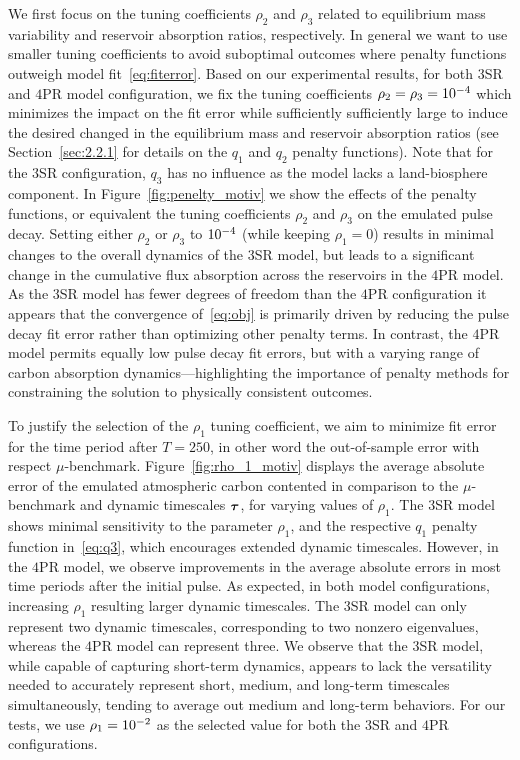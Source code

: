 \documentclass[11pt, a4paper, pdftex, twoside, dvipsnames]{article}
\renewcommand{\ref}{\cref}
\newcommand{\bb}[1]{\boldsymbol{\bold{#1}}}
\newcommand{\expnum}[2]{
\ifnum#1=1 
  10^{#2} 
\else 
  #1 \! \cdot \! 10^{#2}
\fi
}
\begin{document}
We first focus on the tuning coefficients $\rho_2$ and $\rho_3$ related to equilibrium mass variability and reservoir absorption ratios, respectively.
%
In general we want to use smaller tuning coefficients to avoid suboptimal outcomes where penalty functions outweigh model fit~\eqref{eq:fiterror}.
%
Based on our experimental results, for both $3$SR and $4$PR model configuration, we fix the tuning coefficients $\rho_2=\rho_3=\expnum{1}{-4}$ which minimizes the impact on the fit error while sufficiently sufficiently large to induce the desired changed in the equilibrium mass and reservoir absorption ratios (see Section~\ref{sec:2.2.1} for details on the $q_1$ and $q_2$ penalty functions).
%
Note that for the $3$SR configuration, $q_3$ has no influence as the model lacks a land-biosphere component.
%
In Figure~\ref{fig:penelty_motiv} we show the effects of the penalty functions, or equivalent the tuning coefficients $\rho_2$ and $\rho_3$ on the emulated pulse decay.
%
Setting either $\rho_2$ or $\rho_3$ to $\expnum{1}{-4}$ (while keeping $\rho_1=0$) results in minimal changes to the overall dynamics of the $3$SR model, but leads to a significant change in the cumulative flux absorption across the reservoirs in the $4$PR model.
%
As the $3$SR model has fewer degrees of freedom than the $4$PR configuration it appears that the convergence of~\eqref{eq:obj} is primarily driven by reducing the pulse decay fit error rather than optimizing other penalty terms.
%
In contrast, the $4$PR model permits equally low pulse decay fit errors, but with a varying range of carbon absorption dynamics---highlighting the importance of penalty methods for constraining the solution to physically consistent outcomes.



To justify the selection of the $\rho_1$ tuning coefficient, we aim to minimize fit error for the time period after $T=250$, in other word the out-of-sample error with respect $\mu$-benchmark.
%
Figure~\ref{fig:rho_1_motiv} displays the average absolute error of the emulated atmospheric carbon contented in comparison to the $\mu$-benchmark and dynamic timescales $\bb{\tau}$, for varying values of $\rho_1$.
%
The $3$SR model shows minimal sensitivity to the parameter $\rho_1$, and the respective $q_1$ penalty function in~\eqref{eq:q3}, which encourages extended dynamic timescales.
%
However, in the $4$PR model, we observe improvements in the average absolute errors in most time periods after the initial pulse.
%
As expected, in both model configurations, increasing $\rho_1$ resulting larger dynamic timescales.
%
The $3$SR model can only represent two dynamic timescales, corresponding to two nonzero eigenvalues, whereas the $4$PR model can represent three.
%
We observe that the $3$SR model, while capable of capturing short-term dynamics, appears to lack the versatility needed to accurately represent short, medium, and long-term timescales simultaneously, tending to average out medium and long-term behaviors.
%
For our tests, we use $\rho_1=\expnum{1}{-2}$ as the selected value for both the $3$SR and $4$PR configurations.
\end{document}

